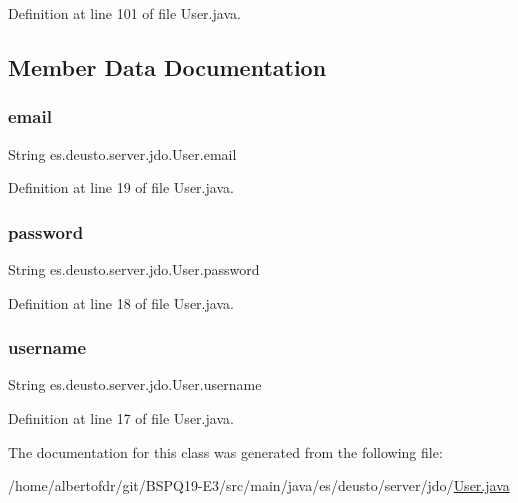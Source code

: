 Definition at line 101 of file User.\+java.



\subsection{Member Data Documentation}
\mbox{\label{classes_1_1deusto_1_1server_1_1jdo_1_1_user_a2aedb628a946e5044f27a3e6cbda31f0}} 
\subsubsection{\texorpdfstring{email}{email}}
{\footnotesize\ttfamily String es.\+deusto.\+server.\+jdo.\+User.\+email}



Definition at line 19 of file User.\+java.

\mbox{\label{classes_1_1deusto_1_1server_1_1jdo_1_1_user_a9e3d470b8d2b36996759bd0595984870}} 
\subsubsection{\texorpdfstring{password}{password}}
{\footnotesize\ttfamily String es.\+deusto.\+server.\+jdo.\+User.\+password}



Definition at line 18 of file User.\+java.

\mbox{\label{classes_1_1deusto_1_1server_1_1jdo_1_1_user_aa1f05a7b487224d7c846fb81e5262c00}} 
\subsubsection{\texorpdfstring{username}{username}}
{\footnotesize\ttfamily String es.\+deusto.\+server.\+jdo.\+User.\+username}



Definition at line 17 of file User.\+java.



The documentation for this class was generated from the following file\+:\begin{DoxyCompactItemize}
\item 
/home/albertofdr/git/\+B\+S\+P\+Q19-\/\+E3/src/main/java/es/deusto/server/jdo/\hyperlink{_user_8java}{User.\+java}\end{DoxyCompactItemize}
